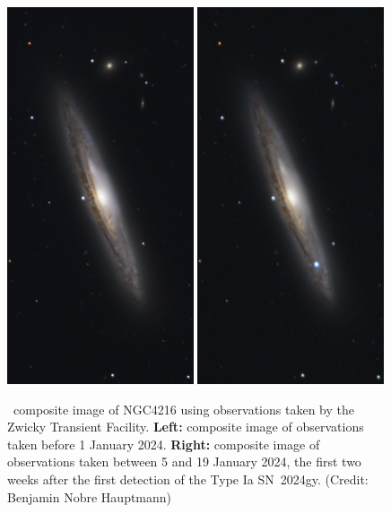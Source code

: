 \documentclass[a4paper,oneside,12pt, class=Latex/Classes/PhDthesisPSnPDF, crop=false]{standalone}
\begin{document}
\begin{figure}
    \centering
    \includegraphics[width=0.49\textwidth]{../Images/chapter_1/SN2024gy_pre-SN.png}
    \includegraphics[width=0.49\textwidth]{../Images/chapter_1/SN2024gy_active.png}
    \caption{\ztfg\ztfr\ztfi\ composite image of NGC4216 using observations taken by the Zwicky Transient Facility. \textbf{Left:} composite image of observations taken before 1 January 2024. \textbf{Right:} composite image of observations taken between 5 and 19 January 2024, the first two weeks after the first detection of the Type Ia SN~2024gy. (Credit: Benjamin Nobre Hauptmann)} %
    \label{2024gy_ZTF}
\end{figure}
\end{document}
